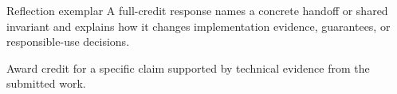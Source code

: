 \documentclass[aspectratio=169,11pt]{beamer}
\begin{document}
\begin{frame}{Reflection exemplar}
\small
\answerlabel A full-credit response names a concrete handoff or shared invariant and explains how it changes implementation evidence, guarantees, or responsible-use decisions.

\vspace{0.25cm}
\gradinglabel Award credit for a specific claim supported by technical evidence from the submitted work.
\end{frame}
\end{document}
